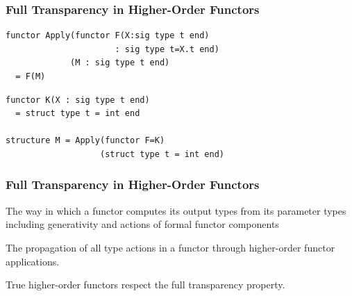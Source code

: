 \documentclass{beamer}
\begin{document}
\begin{frame}[fragile]
\frametitle{Full Transparency in Higher-Order Functors}
\begin{lstlisting}
functor Apply(functor F(X:sig type t end) 
                      : sig type t=X.t end) 
             (M : sig type t end)	
  = F(M)
\end{lstlisting} 

\begin{lstlisting}
functor K(X : sig type t end) 
  = struct type t = int end	

structure M = Apply(functor F=K)
                   (struct type t = int end)
\end{lstlisting}
\begin{block}{}
\end{block}
\end{frame}


\begin{frame}
\frametitle{Full Transparency in Higher-Order Functors}
\begin{definition}
	The way in which a functor computes its output types from its parameter types including generativity and actions of formal functor components
\end{definition}
\begin{definition}
	The propagation of all \alert{type actions} in a functor through higher-order functor applications. 	
\end{definition}
\begin{definition}
True higher-order functors respect the \alert{full transparency} property. 
\end{definition}
\end{frame}
\end{document}
